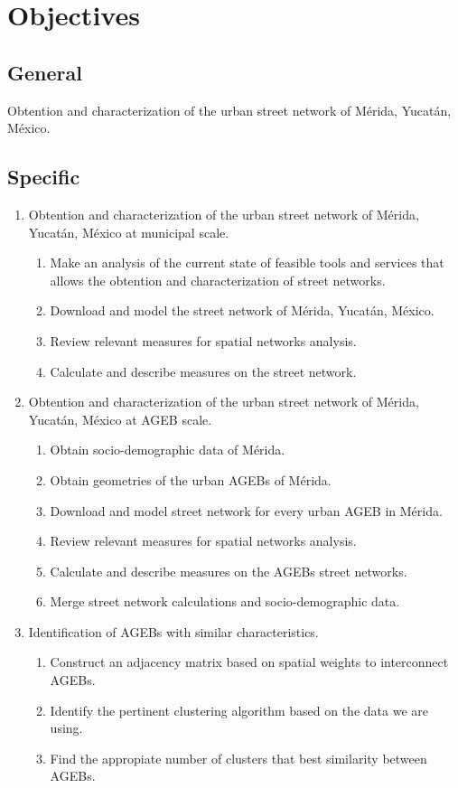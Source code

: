 \section{Objectives}
\subsection {General}
 
Obtention and characterization of the urban street network of Mérida, Yucatán, México.
 
\subsection {Specific}

\begin{enumerate}
\item Obtention and characterization of the urban street network of Mérida, Yucatán, México at municipal scale.
\begin{enumerate}
    \item Make an analysis of the current state of feasible tools and services that allows the obtention and characterization of street networks.
    \item Download and model the street network of Mérida, Yucatán, México.
    \item Review relevant measures for spatial networks analysis.
    \item Calculate and describe measures on the street network.
\end{enumerate}


\item Obtention and characterization of the urban street network of Mérida, Yucatán, México at AGEB scale.
\begin{enumerate}
	\item Obtain socio-demographic data of Mérida.
	\item Obtain geometries of the urban AGEBs of Mérida.
	\item Download and model street network for every urban AGEB in Mérida.
	\item Review relevant measures for spatial networks analysis.
	\item Calculate and describe measures on the AGEBs street networks.
	\item Merge street network calculations and socio-demographic data.
\end{enumerate}


\item Identification of AGEBs with similar characteristics. 
\begin{enumerate}
	\item Construct an adjacency matrix based on spatial weights to interconnect AGEBs.
	\item Identify the pertinent clustering algorithm based on the data we are using.
	\item Find the appropiate number of clusters that best similarity between AGEBs.
\end{enumerate}
\end{enumerate}


